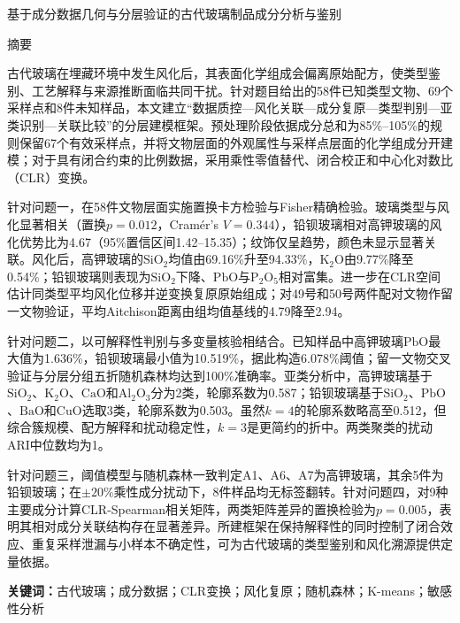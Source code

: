 \documentclass[UTF8,a4paper,zihao=-4,fontset=windows]{ctexart}
\newcommand{\keywords}[1]{\par\noindent\textbf{关键词：}#1}
\begin{document}
\begin{center}
  \vspace*{-0.50cm}
  {\heiti{}基于成分数据几何与分层验证的古代玻璃制品成分分析与鉴别\par}
\end{center}

\vspace{0.65em}
\begin{center}
\begin{minipage}{0.94\textwidth}
\begin{center}{\heiti{}摘\quad 要}\end{center}
\hspace*{2em}古代玻璃在埋藏环境中发生风化后，其表面化学组成会偏离原始配方，使类型鉴别、工艺解释与来源推断面临共同干扰。针对题目给出的58件已知类型文物、69个采样点和8件未知样品，本文建立“数据质控—风化关联—成分复原—类型判别—亚类识别—关联比较”的分层建模框架。预处理阶段依据成分总和为85\%--105\%的规则保留67个有效采样点，并将文物层面的外观属性与采样点层面的化学组成分开建模；对于具有闭合约束的比例数据，采用乘性零值替代、闭合校正和中心化对数比（CLR）变换。

\hspace*{2em}针对问题一，在58件文物层面实施置换卡方检验与Fisher精确检验。玻璃类型与风化显著相关（置换$p=0.012$，Cram\'{e}r's $V=0.344$），铅钡玻璃相对高钾玻璃的风化优势比为4.67（95\%置信区间1.42--15.35）；纹饰仅呈趋势，颜色未显示显著关联。风化后，高钾玻璃的$\mathrm{SiO_2}$均值由69.16\%升至94.33\%，$\mathrm{K_2O}$由9.77\%降至0.54\%；铅钡玻璃则表现为$\mathrm{SiO_2}$下降、$\mathrm{PbO}$与$\mathrm{P_2O_5}$相对富集。进一步在CLR空间估计同类型平均风化位移并逆变换复原原始组成；对49号和50号两件配对文物作留一文物验证，平均Aitchison距离由组均值基线的4.79降至2.94。

\hspace*{2em}针对问题二，以可解释性判别与多变量核验相结合。已知样品中高钾玻璃$\mathrm{PbO}$最大值为1.636\%，铅钡玻璃最小值为10.519\%，据此构造6.078\%阈值；留一文物交叉验证与分层分组五折随机森林均达到100\%准确率。亚类分析中，高钾玻璃基于$\mathrm{SiO_2}$、$\mathrm{K_2O}$、$\mathrm{CaO}$和$\mathrm{Al_2O_3}$分为2类，轮廓系数为0.587；铅钡玻璃基于$\mathrm{SiO_2}$、$\mathrm{PbO}$、$\mathrm{BaO}$和$\mathrm{CuO}$选取3类，轮廓系数为0.503。虽然$k=4$的轮廓系数略高至0.512，但综合簇规模、配方解释和扰动稳定性，$k=3$是更简约的折中。两类聚类的扰动ARI中位数均为1。

\hspace*{2em}针对问题三，阈值模型与随机森林一致判定A1、A6、A7为高钾玻璃，其余5件为铅钡玻璃；在$\pm20\%$乘性成分扰动下，8件样品均无标签翻转。针对问题四，对9种主要成分计算CLR-Spearman相关矩阵，两类矩阵差异的置换检验为$p=0.005$，表明其相对成分关联结构存在显著差异。所建框架在保持解释性的同时控制了闭合效应、重复采样泄漏与小样本不确定性，可为古代玻璃的类型鉴别和风化溯源提供定量依据。

\keywords{古代玻璃；成分数据；CLR变换；风化复原；随机森林；K-means；敏感性分析}
\end{minipage}
\end{center}
\newpage
\end{document}
